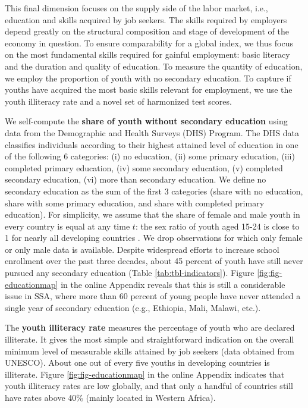 \documentclass[
  a4paper, twoside, 12pt]{book}
\begin{document}
This final dimension focuses on the supply side of the labor market, i.e., education and skills acquired by job seekers. The skills required by employers depend greatly on the structural composition and stage of development of the economy in question. To ensure comparability for a global index, we thus focus on the most fundamental skills required for gainful employment: basic literacy and the duration and quality of education. To measure the quantity of education, we employ the proportion of youth with no secondary education. To capture if youths have acquired the most basic skills relevant for employment, we use the youth illiteracy rate and a novel set of harmonized test scores.

We self-compute the \textbf{share of youth without secondary education} using data from the Demographic and Health Surveys (DHS) Program. The DHS data classifies individuals according to their highest attained level of education in one of the following 6 categories: (i) no education, (ii) some primary education, (iii) completed primary education, (iv) some secondary education, (v) completed secondary education, (vi) more than secondary education. We define no secondary education as the sum of the first 3 categories (share with no education, share with some primary education, and share with completed primary education). For simplicity, we assume that the share of female and male youth in every country is equal at any time \(t\): the sex ratio of youth aged 15-24 is close to 1 for nearly all developing countries \autocite{cia2016}. We drop observations for which only female or only male data is available. Despite widespread efforts to increase school enrollment over the past three decades, about 45 percent of youth have still never pursued any secondary education (Table \ref{tab:tbl-indicators}). Figure \ref{fig:fig-educationmap} in the online Appendix reveals that this is still a considerable issue in SSA, where more than 60 percent of young people have never attended a single year of secondary education (e.g., Ethiopia, Mali, Malawi, etc.).

The \textbf{youth illiteracy rate} measures the percentage of youth who are declared illiterate. It gives the most simple and straightforward indication on the overall minimum level of measurable skills attained by job seekers (data obtained from UNESCO). About one out of every five youths in developing countries is illiterate. Figure \ref{fig:fig-educationmap} in the online Appendix indicates that youth illiteracy rates are low globally, and that only a handful of countries still have rates above 40\% (mainly located in Western Africa).
\end{document}
